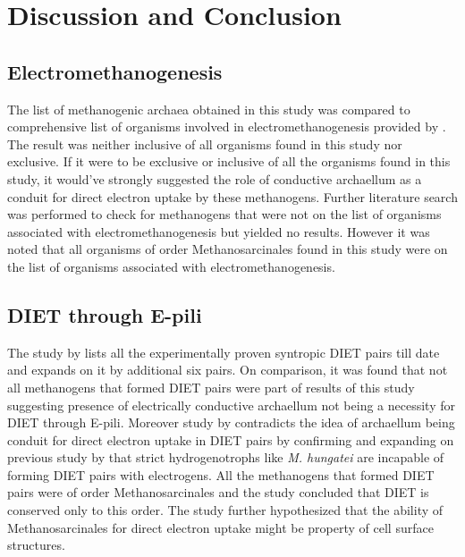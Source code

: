 \documentclass[fontsize=12pt,headsepline=true, bibliography=totocnumbered, twoside]{scrbook} %
\begin{document}

\chapter{Discussion and Conclusion}





\section{Electromethanogenesis}

The list of methanogenic archaea obtained in this study was compared to comprehensive list of organisms involved in electromethanogenesis provided by \citet{blasco2017edge}. The result was neither inclusive of all organisms found in this study nor exclusive. If it were to be exclusive or inclusive of all the organisms found in this study, it would've strongly suggested the role of conductive archaellum as a conduit for direct electron uptake by these methanogens. Further literature search was performed to check for methanogens that were not on the list of organisms associated with electromethanogenesis but yielded no results. However  it was noted that all organisms of order Methanosarcinales found in this study were on the list of organisms associated with electromethanogenesis.

\section{DIET through E-pili}

The study by \citet{yee2020extracellular} lists all the experimentally proven syntropic DIET pairs till date and expands on it by additional six pairs. On comparison, it was found that not all methanogens that formed DIET pairs were part of results of this study suggesting presence of electrically conductive archaellum not being a necessity for DIET through E-pili. Moreover study by \citet{yee2020extracellular}  contradicts the idea of archaellum being conduit for direct electron uptake in DIET pairs by confirming and expanding on previous study by \citet{rotaru2014new} that strict hydrogenotrophs like \textit{M. hungatei} are incapable of forming DIET pairs with electrogens. All the methanogens that formed DIET pairs were of order Methanosarcinales and the study concluded that DIET is conserved only to this order. The study further hypothesized that the ability of Methanosarcinales for direct electron uptake might be property of cell surface structures.
\end{document}
